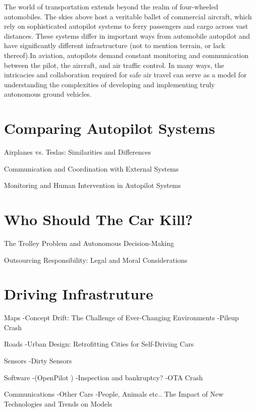 The world of transportation extends beyond the realm of four-wheeled automobiles. The skies above host a veritable ballet of commercial aircraft, which rely on sophisticated autopilot systems to ferry passengers and cargo across vast distances. These systems differ in important ways from automobile autopilot and have significantly different infrastructure (not to mention terrain, or lack thereof).In aviation, autopilots demand constant monitoring and communication between the pilot, the aircraft, and air traffic control. In many ways, the intricacies and collaboration required for safe air travel can serve as a model for understanding the complexities of developing and implementing truly autonomous ground vehicles.

\section{Comparing Autopilot Systems}

Airplanes vs. Teslas: Similarities and Differences

Communication and Coordination with External Systems

Monitoring and Human Intervention in Autopilot Systems

\section{Who Should The Car Kill?}

The Trolley Problem and Autonomous Decision-Making

Outsourcing Responsibility: Legal and Moral Considerations

\section{Driving Infrastruture}

Maps
-Concept Drift: The Challenge of Ever-Changing Environments
-Pileup Crash \cite{pileupcrash}

Roads
-Urban Design: Retrofitting Cities for Self-Driving Cars

Sensors
-Dirty Sensors 

Software 
-(OpenPilot \cite{openpilot})
-Inspection and bankruptcy?
-OTA Crash \cite{otacrash}

Communications
-Other Cars
-People, Animals etc.. The Impact of New Technologies and Trends on Models


